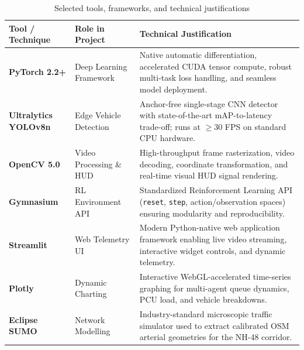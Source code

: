 \begin{table}[htbp]
\centering
\small
\caption{Selected tools, frameworks, and technical justifications}
\label{tab:selected_tools}
\begin{tabularx}{\textwidth}{|p{3.0cm}|p{3.2cm}|X|}
\hline
\textbf{Tool / Technique} & \textbf{Role in Project} & \textbf{Technical Justification} \\ \hline
\textbf{PyTorch 2.2+} & Deep Learning Framework & Native automatic differentiation, accelerated CUDA tensor compute, robust multi-task loss handling, and seamless model deployment. \\ \hline
\textbf{Ultralytics YOLOv8n} & Edge Vehicle Detection & Anchor-free single-stage CNN detector with state-of-the-art mAP-to-latency trade-off; runs at $\ge 30$ FPS on standard CPU hardware. \\ \hline
\textbf{OpenCV 5.0} & Video Processing \& HUD & High-throughput frame rasterization, video decoding, coordinate transformation, and real-time visual HUD signal rendering. \\ \hline
\textbf{Gymnasium} & RL Environment API & Standardized Reinforcement Learning API (\texttt{reset}, \texttt{step}, action/observation spaces) ensuring modularity and reproducibility. \\ \hline
\textbf{Streamlit} & Web Telemetry UI & Modern Python-native web application framework enabling live video streaming, interactive widget controls, and dynamic telemetry. \\ \hline
\textbf{Plotly} & Dynamic Charting & Interactive WebGL-accelerated time-series graphing for multi-agent queue dynamics, PCU load, and vehicle breakdowns. \\ \hline
\textbf{Eclipse SUMO} & Network Modelling & Industry-standard microscopic traffic simulator used to extract calibrated OSM arterial geometries for the NH-48 corridor. \\ \hline
\end{tabularx}
\end{table}
